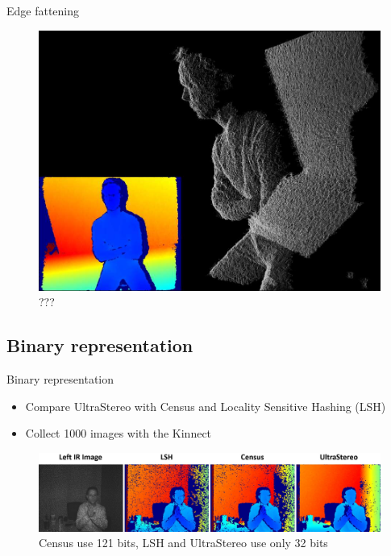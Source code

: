 \begin{frame}{Edge fattening}

\begin{figure}
\includegraphics[scale=0.15]{pictures/fig6}
\caption{???}
\end{figure}
\end{frame}

\subsection{Binary representation}
\begin{frame}{Binary representation}
\begin{itemize}
\item Compare UltraStereo with Census and Locality Sensitive Hashing (LSH)
\item Collect 1000 images with the Kinnect
\end{itemize}
\begin{figure}
\includegraphics[scale=0.1]{pictures/fig7}
\caption{Census use 121 bits, LSH and UltraStereo use only 32 bits}
\end{figure}
\end{frame}

